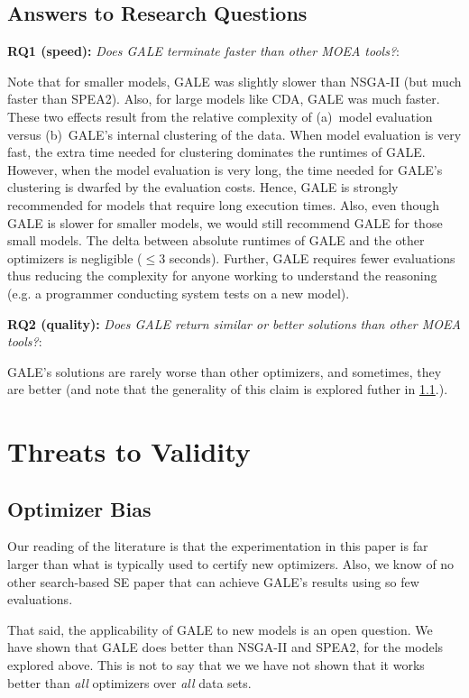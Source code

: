 \documentclass[10pt,journal,compsoc]{IEEEtran}
\newcommand{\tion}[1]{\textsection\ref{sec:#1}}
\begin{document}
\subsection{Answers to Research Questions}

{\bf RQ1 (speed):} {\em Does GALE terminate faster than other MOEA tools?}:

Note that 
for  smaller models, GALE was slightly slower than NSGA-II (but much faster than 
SPEA2). Also, for large models like CDA, GALE was much faster.
These two effects result from the relative complexity
of (a)~model evaluation versus (b)~GALE's internal clustering of the data.
When model evaluation is very fast, the extra time needed for clustering
dominates the runtimes of GALE.  However, when the
model evaluation is very long, the time
needed for GALE's clustering is dwarfed by the evaluation costs. Hence,
GALE is strongly recommended for models that require long execution times.
Also, even though GALE is slower for smaller models, we would still recommend GALE 
for those small models.
The delta between absolute runtimes of GALE and the other optimizers is negligible 
($\le 3$ seconds).
Further, GALE requires fewer evaluations thus reducing the complexity
for anyone working to understand the reasoning (e.g.  a
programmer conducting system tests on a new model).

{\bf RQ2 (quality):} {\em Does  GALE  return  similar or better solutions than other MOEA tools?}:

GALE's solutions are rarely worse than other optimizers, and sometimes, they are 
better (and note that the generality of this claim is explored futher in \tion{ob}.).


\section{Threats to Validity}


\subsection{Optimizer Bias}\label{sec:ob}
Our reading of 
the 
literature
is that the experimentation in this paper is far larger than
what is typically used
to certify new optimizers.  
Also, we know of no other search-based
SE paper that can achieve GALE's results using so few evaluations.

That said, the applicability of GALE to new models is an open question. We have shown that GALE does better than NSGA-II and SPEA2, for the models
 explored above. This is not to say that we we have not shown
that it works better than {\em all} optimizers over {\em all} data sets. 
 
\end{document}
